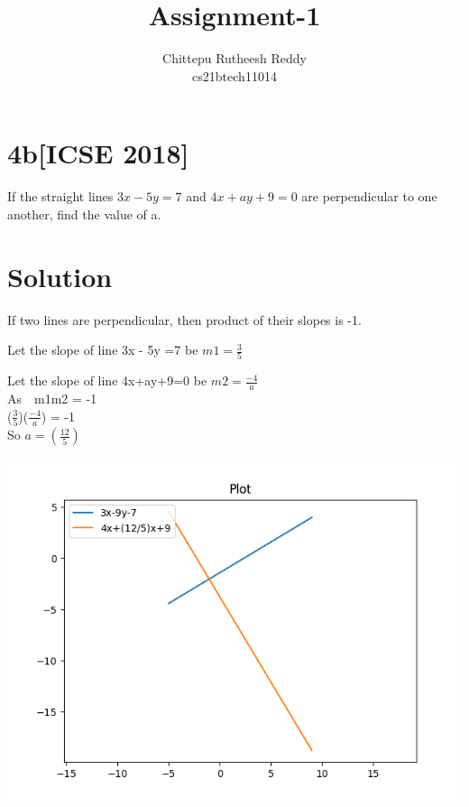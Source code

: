 \documentclass[18pt]{article}
\title{\textbf{Assignment-1}}
\author{Chittepu Rutheesh Reddy \\
  cs21btech11014}
\begin{document}
\maketitle{}

\section*{4b[ICSE 2018]}

If the straight lines $3x- 5y = 7$ and $4x+ ay+ 9 = 0$ are perpendicular to one 
another, find the value of a.

\section*{Solution}
If two lines are perpendicular, then product of their slopes is -1.
\bigskip

   Let the slope of line 3x - 5y =7 be $m1=\frac{3}{5}$
 \bigskip
   
   Let the slope of line 4x+ay+9=0 be $m2=\frac{-4}{a}$ 
  \\
   
   As  \,\, m1m2 = -1
   \\ 
   
   ($\frac{3}{5}$)($\frac{-4}{a}$) = -1 
  \\
 
   So    $a = (\frac{12}{5})$ \\
  
  \graphicspath{{D:/Semester 2/Probability and Random Variables AI1110/Assignments/1/}}   
\includegraphics[scale=0.5]{Figure_1}
\end{document}

